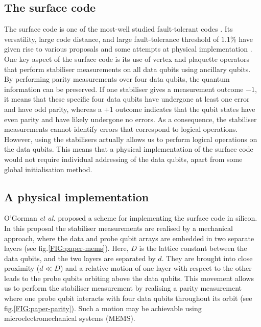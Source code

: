 \subsection{The surface code}
The surface code is one of the most-well studied fault-tolerant codes \cite{Wang2011,Fowler2012}. Its versatility, large code distance, and large fault-tolerance threshold of $1.1\%$ have given rise to various proposals \cite{Fowler2012,Pica2014,Tosi2015,Hill2015,OGorman2016} and some attempts at physical implementation \cite{Barends2014,Kelly2015}. One key aspect of the surface code is its use of vertex and plaquette operators that perform stabiliser measurements on all data qubits using ancillary qubits. By performing parity measurements over four data qubits, the quantum information can be preserved. If one stabiliser gives a measurement outcome $-1$, it means that these specific four data qubits have undergone at least one error and have odd parity, whereas a $+1$ outcome indicates that the qubit states have even parity and have likely undergone no errors. As a consequence, the stabiliser measurements cannot identify errors that correspond to logical operations. However, using the stabilisers actually allows us to perform logical operations on the data qubits. This means that a physical implementation of the surface code would not require individual addressing of the data qubits, apart from some global initialisation method. 







\subsection{A physical implementation} \label{sec:PhysicalImplementation}
O'Gorman \emph{et al.}\@ \citet{OGorman2016} proposed a scheme for implementing the surface code in silicon. In this proposal the stabiliser measurements are realised by a mechanical approach, where the data and probe qubit arrays are embedded in two separate layers (see fig.\@ \ref{FIG:paper-mems}). Here, $D$ is the lattice constant between the data qubits, and the two layers are separated by $d$. They are brought into close proximity ($d\ll D$) and a relative motion of one layer with respect to the other leads to the probe qubits orbiting above the data qubits. This movement allows us to perform the stabiliser measurement by realising a parity measurement where one probe qubit interacts with four data qubits throughout its orbit (see fig.\@ \ref{FIG:paper-parity}). Such a motion may be achievable using microelectromechanical systems (MEMS).


